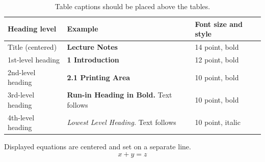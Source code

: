 \documentclass[runningheads]{llncs}
\begin{document}
\begin{table}
\caption{Table captions should be placed above the
tables.}\label{tab1}
\begin{tabular}{|l|l|l|}
\hline
Heading level &  Example & Font size and style\\
\hline
Title (centered) &  {\Large\bfseries Lecture Notes} & 14 point, bold\\
1st-level heading &  {\large\bfseries 1 Introduction} & 12 point, bold\\
2nd-level heading & {\bfseries 2.1 Printing Area} & 10 point, bold\\
3rd-level heading & {\bfseries Run-in Heading in Bold.} Text follows & 10 point, bold\\
4th-level heading & {\itshape Lowest Level Heading.} Text follows & 10 point, italic\\
\hline
\end{tabular}
\end{table}


\noindent Displayed equations are centered and set on a separate
line.
\begin{equation}
x + y = z
\end{equation}
\end{document}
